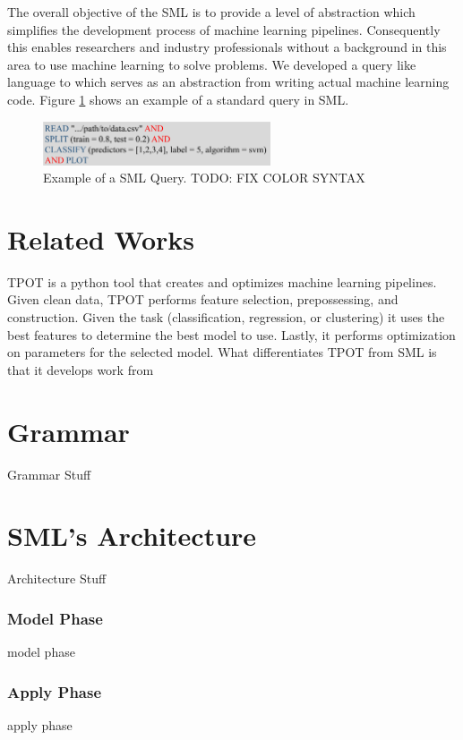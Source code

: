 \documentclass[jair,twoside,11pt,theapa]{article}
\begin{document}
The overall objective of the SML is to provide a level of abstraction which simplifies the development process of machine learning pipelines. Consequently this enables researchers and industry professionals without a background in this area to use machine learning to solve problems. We developed a query like language to which serves as an abstraction from writing actual machine learning code. Figure \ref{fig:sml-ex-1} shows an example of a standard query in SML. 

\begin{figure}
\includegraphics[width=0.6\textwidth]{figs/sml-ex-1.png}
\centering
\caption{Example of a SML Query. TODO: FIX COLOR SYNTAX}
\label{fig:sml-ex-1}
\end{figure}

\section{Related Works}
\label{RelatedWorks}
TPOT \cite{TPOT} is a python tool that creates and optimizes machine learning pipelines. Given clean data, TPOT performs feature selection, prepossessing, and construction. Given the task (classification, regression, or clustering) it uses the best features to determine the best model to use. Lastly, it performs optimization on parameters for the selected model. What differentiates TPOT from SML is that it develops work from

\section{Grammar}
\label{grammar}
Grammar Stuff

\section{SML's Architecture}
\label{sml-architecture}

Architecture Stuff

\subsubsection{Model Phase}
model phase
\subsubsection{Apply Phase}
apply phase
\end{document}
